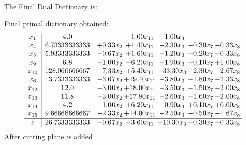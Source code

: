 \documentclass[8pt]{article}
\begin{document}
The Final Dual Dictionary is: 

 Final primal dictionary obtained: 
\[\begin{array}{c| c c@{\hskip 2pt} c@{\hskip 2pt} c@{\hskip 2pt} c@{\hskip 2pt} c@{\hskip 2pt} }
 x_{1}   &  4.0  &   & -1.00 x_{11} & -1.00 x_{3} &    &   \\
 x_{4}   &  6.73333333333 & +  0.33 x_{2} & +  1.40 x_{11} & -2.30 x_{3} & -0.30 x_{7} & -0.33 x_{8}\\
 x_{5}   &  5.93333333333 & -0.67 x_{2} & +  1.60 x_{11} & -1.20 x_{3} & -0.20 x_{7} & -0.33 x_{8}\\
 x_{9}   &  6.8 & -1.00 x_{2} & -6.20 x_{11} & +  1.90 x_{3} & -0.10 x_{7} & +  1.00 x_{8}\\
 x_{10}   &  128.066666667 & -7.33 x_{2} & +  5.40 x_{11} & -33.30 x_{3} & -2.30 x_{7} & -2.67 x_{8}\\
 x_{6}   &  13.7333333333 & -3.67 x_{2} & + 19.40 x_{11} & -3.80 x_{3} & -1.80 x_{7} & -2.33 x_{8}\\
 x_{12}   &  12.0 & -3.00 x_{2} & + 18.00 x_{11} & -3.50 x_{3} & -1.50 x_{7} & -2.00 x_{8}\\
 x_{13}   &  11.8 & -3.00 x_{2} & + 17.80 x_{11} & -2.60 x_{3} & -1.60 x_{7} & -2.00 x_{8}\\
 x_{14}   &  4.2 & -1.00 x_{2} & +  6.20 x_{11} & -0.90 x_{3} & +  0.10 x_{7} & +  0.00 x_{8}\\
 x_{15}   &  9.66666666667 & -2.33 x_{2} & + 14.00 x_{11} & -2.50 x_{3} & -0.50 x_{7} & -1.67 x_{8}\\
\hline
z    &  26.7333333333 & -0.67 x_{2} & -3.60 x_{11} & -10.30 x_{3} & -0.30 x_{7} & -0.33 x_{8}\\
\end{array}\]
 After cutting plane is added 
\end{document}

